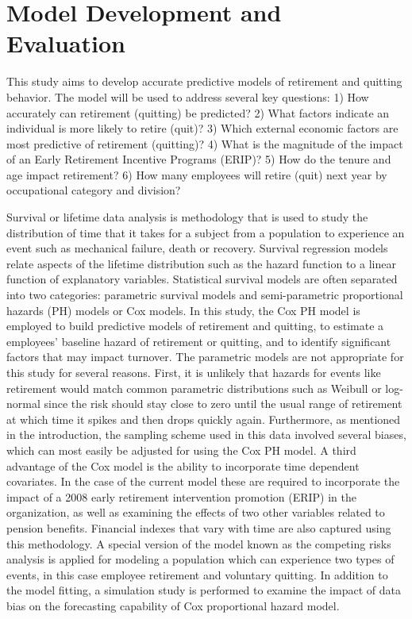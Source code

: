 \section{Model Development and Evaluation}
This study aims to develop accurate predictive models of retirement and quitting behavior. The model will be used to address several key questions:
1) How accurately can retirement (quitting) be predicted?
2) What factors indicate an individual is more likely to retire (quit)?
3) Which external economic factors are most predictive of retirement (quitting)?
4) What is the magnitude of the impact of an Early Retirement Incentive Programs (ERIP)?
5) How do the tenure and age impact retirement?
6) How many employees will retire (quit) next year by occupational category and division?

Survival or lifetime data analysis is methodology that is used to study the distribution of time that it takes for a subject from a population to experience an event such as mechanical failure, death or recovery. Survival regression models relate aspects of the lifetime distribution such as the hazard function to a linear function of explanatory variables.  Statistical survival models are often separated into two categories: parametric survival models and semi-parametric proportional hazards (PH) models or Cox models. In this study, the Cox PH model is employed to build predictive models of retirement and quitting, to estimate a employees' baseline hazard of retirement or quitting, and to identify significant factors that may impact turnover. The parametric models are not appropriate for this study for several reasons. First, it is unlikely that hazards for events like retirement would match common parametric distributions such as Weibull or log-normal since the risk should stay close to zero until the usual range of retirement at which time it spikes and then drops quickly again. Furthermore, as mentioned in the introduction, the sampling scheme used in this data involved several biases, which can most easily be adjusted for using the Cox PH model. A third advantage of the Cox model is the ability to incorporate time dependent covariates. In the case of the current model these are required to incorporate the impact of a 2008 early retirement intervention promotion (ERIP) in the organization, as well as examining the effects of two other variables related to pension benefits. Financial indexes that vary with time are also captured using this methodology. A special version of the model known as the competing risks analysis is applied for modeling a population which can experience two types of events, in this case employee retirement and voluntary quitting. In addition to the model fitting, a simulation study is performed to examine the impact of data bias on the forecasting capability of Cox proportional hazard model.
